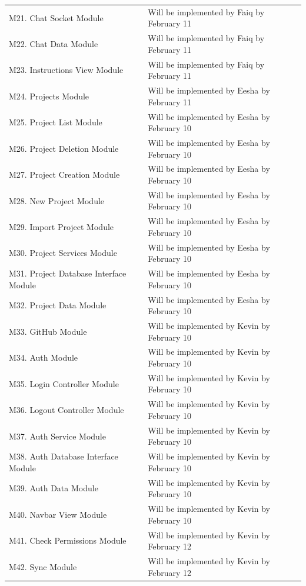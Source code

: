 \documentclass[12pt, titlepage]{article}
\begin{document}
\begin{longtable}{p{} p{}}
		M21. Chat Socket Module &  Will be implemented by Faiq by February 11  \\
		M22. Chat Data Module &  Will be implemented by Faiq by February 11  \\
		M23. Instructions View Module &  Will be implemented by Faiq by February 11  \\
		M24. Projects Module &  Will be implemented by Eesha by February 11  \\
		M25. Project List Module &  Will be implemented by Eesha by February 10  \\
		M26. Project Deletion Module &  Will be implemented by Eesha by February 10  \\
		M27. Project Creation Module &  Will be implemented by Eesha by February 10  \\
		M28. New Project Module &  Will be implemented by Eesha by February 10  \\
		M29. Import Project Module  &  Will be implemented by Eesha by February 10 \\
		M30. Project Services Module &  Will be implemented by Eesha by February 10  \\
		M31. Project Database Interface Module &  Will be implemented by Eesha by February 10  \\
		M32. Project Data Module &  Will be implemented by Eesha by February 10  \\
		M33. GitHub Module &  Will be implemented by Kevin by February 10  \\
		M34. Auth Module &  Will be implemented by Kevin by February 10  \\
		M35. Login Controller Module &  Will be implemented by Kevin by February 10  \\
		M36. Logout Controller Module &  Will be implemented by Kevin by February 10  \\
		M37. Auth Service Module &  Will be implemented by Kevin by February 10  \\
		M38. Auth Database Interface Module &  Will be implemented by Kevin by February 10  \\
		M39. Auth Data Module &  Will be implemented by Kevin by February 10  \\
		M40. Navbar View Module &  Will be implemented by Kevin by February 10  \\
		M41. Check Permissions Module &  Will be implemented by Kevin by February 12  \\
		M42. Sync Module &  Will be implemented by Kevin by February 12  \\

\end{longtable}
\end{document}
